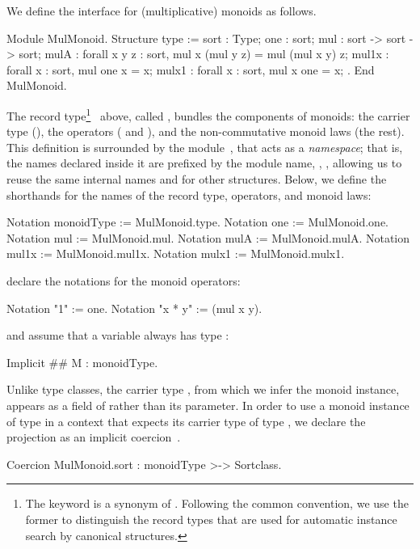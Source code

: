 \documentclass[a4paper,UKenglish,cleveref,autoref]{lipics-v2021}
\begin{document}
We define the interface for (multiplicative) monoids as follows.
\begin{rocqcode}
Module MulMonoid.
Structure type :=
  { sort : Type;
    one : sort;
    mul : sort -> sort -> sort;
    mulA : forall x y z : sort, mul x (mul y z) = mul (mul x y) z;
    mul1x : forall x : sort, mul one x = x;
    mulx1 : forall x : sort, mul x one = x; }.
End MulMonoid.
\end{rocqcode}
The record type\footnote{The  keyword is a synonym of . Following the
common convention, we use the former to distinguish the record types that are used for automatic
instance search by canonical structures.}~\cite{rocqrefman:records} above, called ,
bundles the components of monoids: the carrier type (), the operators ( and
), and the non-commutative monoid laws (the rest).
This definition is surrounded by the  module~\cite{rocqrefman:modules}, that acts as
a \emph{namespace}; that is, the names declared inside it are prefixed by the module name, \eg,
, allowing us to reuse the same internal names  and  for
other structures.
Below, we define the shorthands for the names of the record type, operators, and monoid laws:
\begin{rocqcode}
Notation monoidType := MulMonoid.type.
Notation one := MulMonoid.one.          Notation mul := MulMonoid.mul.
Notation mulA := MulMonoid.mulA.
Notation mul1x := MulMonoid.mul1x.      Notation mulx1 := MulMonoid.mulx1.
\end{rocqcode}
declare the notations for the monoid operators:
\begin{rocqcode}
Notation "1" := one.                    Notation "x * y" := (mul x y).
\end{rocqcode}
and assume that a variable  always has type :
\begin{rocqcode}
Implicit ## M : monoidType.
\end{rocqcode}


Unlike type classes, the carrier type , from which we infer the monoid instance, appears
as a field of  rather than its parameter.
In order to use a monoid instance  of type  in a context that expects its
carrier type of type , we declare the  projection as an implicit
coercion~\cite{rocqrefman:coercion}.
\begin{rocqcode}
Coercion MulMonoid.sort : monoidType >-> Sortclass.
\end{rocqcode}
\end{document}
